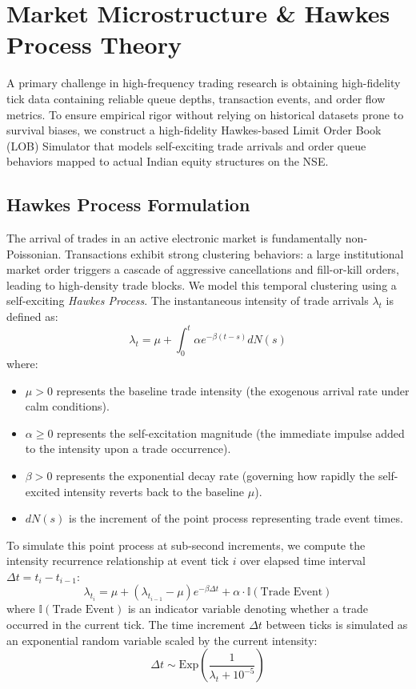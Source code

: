 \documentclass[11pt,a4paper]{article}
\begin{document}
\section{Market Microstructure & Hawkes Process Theory}
A primary challenge in high-frequency trading research is obtaining high-fidelity tick data containing reliable queue depths, transaction events, and order flow metrics. To ensure empirical rigor without relying on historical datasets prone to survival biases, we construct a high-fidelity Hawkes-based Limit Order Book (LOB) Simulator that models self-exciting trade arrivals and order queue behaviors mapped to actual Indian equity structures on the NSE.

\subsection{Hawkes Process Formulation}
The arrival of trades in an active electronic market is fundamentally non-Poissonian. Transactions exhibit strong clustering behaviors: a large institutional market order triggers a cascade of aggressive cancellations and fill-or-kill orders, leading to high-density trade blocks. We model this temporal clustering using a self-exciting \textit{Hawkes Process}. The instantaneous intensity of trade arrivals $\lambda_t$ is defined as:
\begin{equation}
    \lambda_t = \mu + \int_{0}^{t} \alpha e^{-\beta(t - s)} dN(s)
\end{equation}
where:
\begin{itemize}
    \item $\mu > 0$ represents the baseline trade intensity (the exogenous arrival rate under calm conditions).
    \item $\alpha \geq 0$ represents the self-excitation magnitude (the immediate impulse added to the intensity upon a trade occurrence).
    \item $\beta > 0$ represents the exponential decay rate (governing how rapidly the self-excited intensity reverts back to the baseline $\mu$).
    \item $dN(s)$ is the increment of the point process representing trade event times.
\end{itemize}

To simulate this point process at sub-second increments, we compute the intensity recurrence relationship at event tick $i$ over elapsed time interval $\Delta t = t_i - t_{i-1}$:
\begin{equation}
    \lambda_{t_i} = \mu + (\lambda_{t_{i-1}} - \mu) e^{-\beta \Delta t} + \alpha \cdot \mathbb{I}(\text{Trade Event})
\end{equation}
where $\mathbb{I}(\text{Trade Event})$ is an indicator variable denoting whether a trade occurred in the current tick. The time increment $\Delta t$ between ticks is simulated as an exponential random variable scaled by the current intensity:
\begin{equation}
    \Delta t \sim \text{Exp}\left(\frac{1}{\lambda_t + 10^{-5}}\right)
\end{equation}
\end{document}
